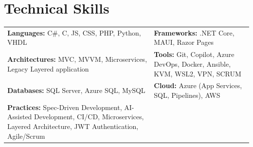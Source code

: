 \section*{Technical Skills}
\begin{tabularx}{\textwidth}{X X}
\textbf{Languages:} C\#, C, JS, CSS, PHP, Python, VHDL & 
\textbf{Frameworks:} .NET Core, MAUI, Razor Pages \\

\textbf{Architectures:} MVC, MVVM, Microservices, Legacy Layered application & 
\textbf{Tools:} Git, Copilot, Azure DevOps, Docker, Ansible, KVM, WSL2, VPN, SCRUM \\
\textbf{Databases:} SQL Server, Azure SQL, MySQL &
\textbf{Cloud:} Azure (App Services, SQL, Pipelines), AWS \\
\textbf{Practices:} Spec-Driven Development, AI-Assisted Development, CI/CD, Microservices, Layered Architecture, JWT Authentication, Agile/Scrum & \\
\end{tabularx}
